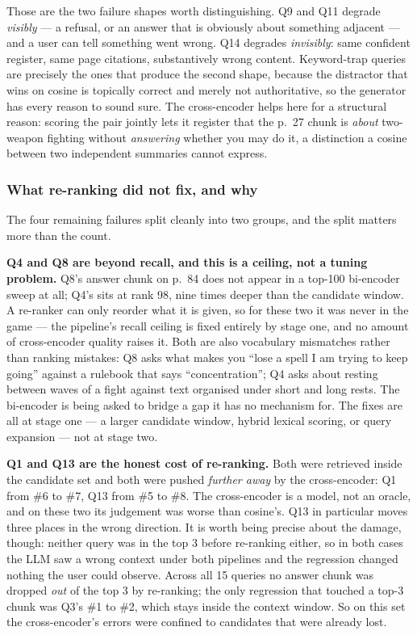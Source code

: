 \documentclass[11pt,a4paper]{article}
\begin{document}
Those are the two failure shapes worth distinguishing. Q9 and Q11 degrade
\emph{visibly} --- a refusal, or an answer that is obviously about something
adjacent --- and a user can tell something went wrong. Q14 degrades
\emph{invisibly}: same confident register, same page citations, substantively
wrong content. Keyword-trap queries are precisely the ones that produce the
second shape, because the distractor that wins on cosine is topically correct
and merely not authoritative, so the generator has every reason to sound sure.
The cross-encoder helps here for a structural reason: scoring the pair jointly
lets it register that the p.~27 chunk is \emph{about} two-weapon fighting
without \emph{answering} whether you may do it, a distinction a cosine between
two independent summaries cannot express.

\subsubsection*{What re-ranking did not fix, and why}

The four remaining failures split cleanly into two groups, and the split
matters more than the count.

\textbf{Q4 and Q8 are beyond recall, and this is a ceiling, not a tuning
problem.} Q8's answer chunk on p.~84 does not appear in a top-100 bi-encoder
sweep at all; Q4's sits at rank 98, nine times deeper than the candidate
window. A re-ranker can only reorder what it is given, so for these two it was
never in the game --- the pipeline's recall ceiling is fixed entirely by stage
one, and no amount of cross-encoder quality raises it. Both are also
vocabulary mismatches rather than ranking mistakes: Q8 asks what makes you
``lose a spell I am trying to keep going'' against a rulebook that says
``concentration''; Q4 asks about resting between waves of a fight against text
organised under short and long rests. The bi-encoder is being asked to bridge a
gap it has no mechanism for. The fixes are all at stage one --- a larger
candidate window, hybrid lexical scoring, or query expansion --- not at stage
two.

\textbf{Q1 and Q13 are the honest cost of re-ranking.} Both were retrieved
inside the candidate set and both were pushed \emph{further away} by the
cross-encoder: Q1 from \#6 to \#7, Q13 from \#5 to \#8. The cross-encoder is a
model, not an oracle, and on these two its judgement was worse than cosine's.
Q13 in particular moves three places in the wrong direction. It is worth being
precise about the damage, though: neither query was in the top 3 before
re-ranking either, so in both cases the LLM saw a wrong context under both
pipelines and the regression changed nothing the user could observe. Across all
15 queries no answer chunk was dropped \emph{out} of the top 3 by re-ranking;
the only regression that touched a top-3 chunk was Q3's \#1 to \#2, which stays
inside the context window. So on this set the cross-encoder's errors were
confined to candidates that were already lost.
\end{document}
